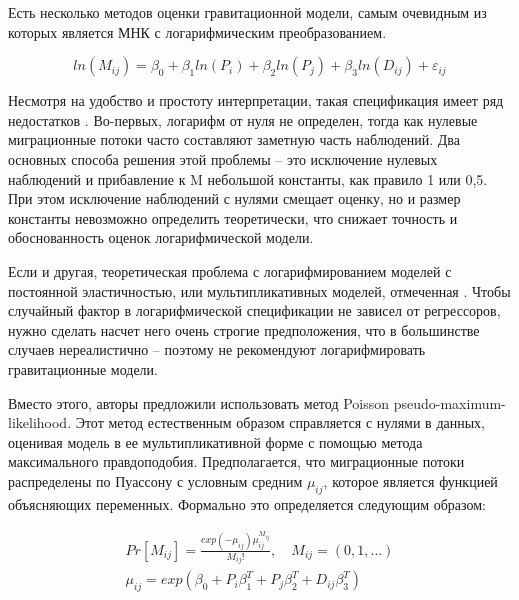 \documentclass[a4paper,12pt]{article}
\begin{document}

Есть несколько методов оценки гравитационной модели, самым очевидным из которых является МНК с логарифмическим преобразованием.

\begin{equation}\label{eq:log}
	ln(M_{ij}) = \beta_0 + {\beta_1}ln(P_{i}) + {\beta_2}ln(P_{j}) + {\beta_3}ln(D_{ij}) + \varepsilon_{ij}
\end{equation}

Несмотря на удобство и простоту интерпретации, такая спецификация имеет ряд недостатков \citep{silva_log_2006}. Во-первых, логарифм от нуля не определен, тогда как нулевые миграционные потоки часто составляют заметную часть наблюдений. Два основных способа решения этой проблемы – это исключение нулевых наблюдений и прибавление к M небольшой константы, как правило 1 или 0,5. При этом исключение наблюдений с нулями смещает оценку, но и размер константы невозможно определить теоретически, что снижает точность и обоснованность оценок логарифмической модели. 

Если и другая, теоретическая проблема с логарифмированием моделей с постоянной эластичностью, или мультипликативных моделей, отмеченная \citeauthor{silva_log_2006}. Чтобы случайный фактор в логарифмической спецификации не зависел от регрессоров, нужно сделать насчет него очень строгие предположения, что в большинстве случаев нереалистично -- поэтому \citeauthor{silva_log_2006} не рекомендуют логарифмировать гравитационные модели. 

Вместо этого, авторы предложили использовать метод Poisson pseudo-maximum-likelihood. Этот метод естественным образом справляется с нулями в данных, оценивая модель в ее мультипликативной форме с помощью метода максимального правдоподобия. Предполагается, что миграционные потоки распределены по Пуассону с условным средним $\mu_{ij}$, которое является функцией объясняющих переменных. Формально это определяется следующим образом:

\begin{gather*}\label{eq:poisson0}
	Pr[M_{ij}] = \frac{exp(-\mu_{ij})\mu^{M_{ij}}_{ij}}{M_{ij}!},\quad M_{ij} = (0, 1, ...) \\
	\mu_{ij} = exp(\beta_0 + P_i \beta_1^T + P_{j} \beta_2^T + D_{ij} \beta_3^T)
\end{gather*}
\end{document}
